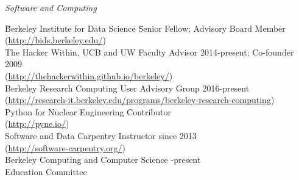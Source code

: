 \vspace*{-.5em}
\textit{Software and Computing}
\begin{tabbing}
\hspace*{2 em}\= Berkeley Institute for Data Science \hspace*{6em} \= Senior Fellow; Advisory Board Member\\ 
\>\hspace*{2 em}(\href{http://bids.berkeley.edu/}{http://bids.berkeley.edu/}) \\
%
\> The Hacker Within, UCB and UW \> Faculty Advisor 2014-present; Co-founder 2009\\
\> \hspace*{2 em}(\href{http://thehackerwithin.github.io/berkeley/}{http://thehackerwithin.github.io/berkeley/})\\
%
\> Berkeley Research Computing  \> User Advisory Group 2016-present \\
\> \hspace*{2 em}(\href{http://research-it.berkeley.edu/programs/berkeley-research-computing}{http://research-it.berkeley.edu/programs/berkeley-research-computing})\\
%
\> Python for Nuclear Engineering  \> Contributor \\
\> \hspace*{2 em}(\href{http://pyne.io/}{http://pyne.io/})\\
%
\> Software and Data Carpentry  \> Instructor since 2013\\
\> \hspace*{2 em}(\href{http://software-carpentry.org/}{http://software-carpentry.org/})\\
%
%
\> Berkeley Computing and Computer Science -present \\
\> \hspace*{2 em}Education Committee%
\end{tabbing}

